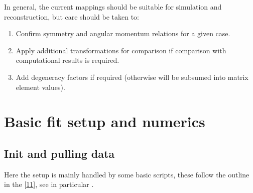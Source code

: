 \documentclass[letterpaper,table,10pt,english]{jupyterBook}
\begin{document}
\sphinxAtStartPar
In general, the current mappings should be suitable for simulation and reconstruction, but care should be taken to:
\begin{enumerate}
%
\item {} 
\sphinxAtStartPar
Confirm symmetry and angular momentum relations for a given case.

\item {} 
\sphinxAtStartPar
Apply additional transformations for comparison if comparison with computational results is required.

\item {} 
\sphinxAtStartPar
Add degeneracy factors if required (otherwise will be subsumed into matrix element values).

\end{enumerate}

\sphinxstepscope


\chapter{Basic fit setup and numerics}
\label{\detokenize{part2/basic_fitting_numerics_intro_260423:basic-fit-setup-and-numerics}}\label{\detokenize{part2/basic_fitting_numerics_intro_260423:sect-basic-fit-setup}}\label{\detokenize{part2/basic_fitting_numerics_intro_260423::doc}}

\section{Init and pulling data}
\label{\detokenize{part2/basic_fitting_numerics_intro_260423:init-and-pulling-data}}
\sphinxAtStartPar
Here the setup is mainly handled by some basic scripts, these follow the outline in the  {[}\hyperlink{cite.backmatter/bibliography:id617}{11}{]}, see in particular .
\end{document}
